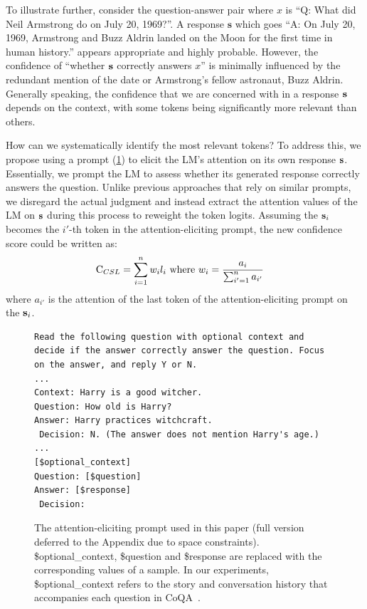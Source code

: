 To illustrate further, consider the question-answer pair where $x$ is ``Q: What did Neil Armstrong do on July 20, 1969?''.
A response $\mathbf{s}$ which goes ``A: On July 20, 1969, Armstrong and Buzz Aldrin landed on the Moon for the first time in human history.''  appears appropriate and highly probable.
However, the confidence of ``whether $\mathbf{s}$ correctly answers $x$'' is minimally influenced by the redundant mention of the date or Armstrong's fellow astronaut, Buzz Aldrin.
Generally speaking, the confidence that we are concerned with in a response $\mathbf{s}$ depends on the context, with some tokens being significantly more relevant than others.



How can we systematically identify the most relevant tokens?
To address this, we propose using a prompt (\cref{fig:prompt_short}) to elicit the LM's attention on its own response $\mathbf{s}$.
Essentially, we prompt the LM to assess whether its generated response correctly answers the question. 
Unlike previous approaches that rely on similar prompts, we disregard the actual judgment and instead extract the attention values of the LM on $\mathbf{s}$ during this process to reweight the token logits.
Assuming the $\mathbf{s}_i$ becomes the $i'$-th token in the attention-eliciting prompt, the new confidence score could be written as:
\begin{align}
    \text{C}_{CSL} = \sum_{i=1}^n w_i l_i 
    \text{ where } & w_i = \frac{a_{i}}{\sum_{i'=1}^n a_{i'}} \label{eq:main}
\end{align}
where $a_{i'}$ is the attention of the last token of the attention-eliciting prompt on the $\mathbf{s}_i$. %


\begin{figure}[ht]
\begin{lstlisting}[basicstyle=\footnotesize\ttfamily]
Read the following question with optional context and decide if the answer correctly answer the question. Focus on the answer, and reply Y or N.
...
Context: Harry is a good witcher.
Question: How old is Harry?
Answer: Harry practices witchcraft.
 Decision: N. (The answer does not mention Harry's age.)
...
[$optional_context]
Question: [$question]
Answer: [$response]
 Decision:
\end{lstlisting}
\caption{The attention-eliciting prompt used in this paper (full version deferred to the Appendix due to space constraints).
{\color{blue}\$optional\_context}, {\color{blue}\$question} and {\color{blue}\$response} are replaced with the corresponding values of a sample.
In our experiments, {\color{blue}\$optional\_context} refers to the story and conversation history that accompanies each question in CoQA~\citep{reddy-etal-2019-coqa}.
}\label{fig:prompt_short}
\end{figure}

